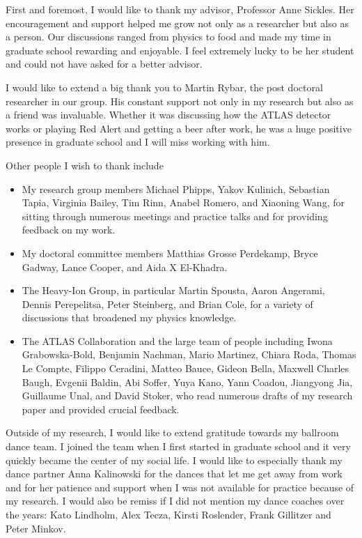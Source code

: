 
First and foremost, I would like to thank my advisor, Professor Anne Sickles.
Her encouragement and support helped me grow not only as a researcher but also as a person.
Our discussions ranged from physics to food and made my time in graduate school rewarding and enjoyable. 
I feel extremely lucky to be her student and could not have asked for a better advisor.

I would like to extend a big thank you to Martin Rybar, the post doctoral researcher in our group.
His constant support not only in my research but also as a friend was invaluable.
Whether it was discussing how the ATLAS detector works or playing Red Alert and getting a beer after work, he was a huge positive presence in graduate school and I will miss working with him.

Other people I wish to thank include
\begin{itemize}

\item My research group members Michael Phipps, Yakov Kulinich, Sebastian Tapia, Virginia Bailey, Tim Rinn, Anabel Romero, and Xiaoning Wang, for sitting through numerous meetings and practice talks and for providing feedback on my work.

\item My doctoral committee members Matthias Grosse Perdekamp, Bryce Gadway, Lance Cooper, and Aida X El-Khadra.

\item The Heavy-Ion Group, in particular Martin Spousta, Aaron Angerami, Dennis Perepelitsa, Peter Steinberg, and Brian Cole, for a variety of discussions that broadened my physics knowledge.

\item The ATLAS Collaboration and the large team of people including Iwona Grabowska-Bold, Benjamin Nachman, Mario Martinez, Chiara Roda, Thomas Le Compte, Filippo Ceradini, Matteo Bauce, Gideon Bella, Maxwell Charles Baugh, Evgenii Baldin, Abi Soffer, Yuya Kano, Yann Coadou, Jiangyong Jia, Guillaume Unal, and David Stoker, who read numerous drafts of my research paper and provided crucial feedback.

\end{itemize}

Outside of my research, I would like to extend gratitude towards my ballroom dance team.
I joined the team when I first started in graduate school and it very quickly became the center of my social life.
I would like to especially thank my dance partner Anna Kalinowski for the dances that let me get away from work and for her patience and support when I was not available for practice because of my research.
I would also be remiss if I did not mention my dance coaches over the years: Kato Lindholm, Alex Tecza, Kirsti Roslender, Frank Gillitzer and Peter Minkov.

